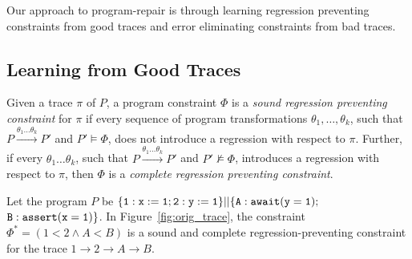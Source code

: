 \documentclass{llncs}
\newcommand\Prog{\ensuremath{\mathit{P}}}
\newcommand\ProgCons{\ensuremath{\Phi}}
\newcommand\trace{\pi}
\newcommand\reorder{\theta}
\begin{document}
Our approach to program-repair is through
learning regression preventing constraints from good traces 
and error eliminating constraints from bad traces.


\subsection{Learning from Good Traces}
\label{sec:learn_good}

Given a trace $\trace$ of $\Prog$, a program constraint $\ProgCons$ is a
{\em sound regression preventing constraint} for $\trace$ if every
sequence of program transformations $\reorder_1,\ldots,\reorder_k$,
such that $\Prog\xrightarrow{\reorder_1\ldots
\reorder_k}\Prog'$ and $\Prog'\models\ProgCons$, does not introduce a
regression with respect to $\trace$.
Further, if every $\reorder_1\ldots\reorder_k$, such that
$\Prog\xrightarrow{\reorder_1\ldots \reorder_k}\Prog'$ and
$\Prog'\not\models\ProgCons$, introduces a regression with respect to
$\trace$, then $\ProgCons$ is a {\em complete regression preventing
constraint}.

\begin{example}
  \label{ex:sound_complete_cons}
  Let the program $\Prog$ be ${\tt \{ 1: x := 1; 2: y := 1 \} || \{ A:
  await (y = 1);}$ ${\tt B:assert (x = 1) \}}$. 
  In Figure~\ref{fig:orig_trace}, the constraint $\ProgCons^* = (1 <
  2 \wedge A<B)$ is a sound and complete regression-preventing
  constraint for the trace $1 \to 2 \to A \to B$.
\end{example}
\end{document}
